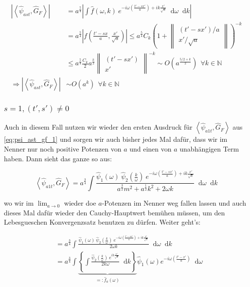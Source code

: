 \documentclass{scrartcl}
\renewcommand*\d{\mathop{}\!\mathrm{d}}
\begin{document}
\begin{align}
    \left| \left< \hat\psi_{ast}, \hat G_F \right> \right|
    &=
    a^\frac{5}{4} \left|  \int \hat f(\omega, k)
    ~e^{-i \omega \left(\frac{t'-sx'}{a}\right) + ik \frac{x'}{\sqrt{a}}}
    \d \omega \d k
    \right|
    \nonumber \\
    &=
    a^\frac{5}{4} \left| f \left(\frac{t'-sx}{a}, \frac{x'}{\sqrt{a}}\right) \right|
    \leq
    a^\frac{5}{4} C_k\left(
    1 + \left\lVert \substack{(t'-sx')/a \\ x'/\sqrt{a}} \right\rVert
    \right)^{-k}
    \nonumber \\
    &\leq
    a^\frac{5}{4} \frac{C_k}{2} a^{\frac{k}{2}} \left\lVert
    \substack{(t'-sx') \\ x'} \right\rVert^{-k}
    \sim O\left(a^\frac{5/2+k}{2}\right) ~~ \forall k \in \mathbb{N}
    \nonumber \\[1em]
    \Rightarrow
     \left| \left< \hat\psi_{ast}, \hat G_F \right> \right|
     &\sim
     O\left(a^k\right) ~~ \forall k \in \mathbb{N}
\end{align}


\subsubsection*{$s = 1, (t', s') \neq 0$}
Auch in diesem Fall nutzen wir wieder den ersten Ausdruck für
$\left< \hat\psi_{a1t}, \hat G_F \right>$ aus \eqref{eq:psi_ast_gf_1} und sorgen
wir auch bisher jedes Mal dafür, dass wir im Nenner nur noch positive Potenzen von
$a$ und einen von $a$ unabhängigen Term haben. Dann sieht das ganze so aus:

\begin{equation*}
    \left< \hat\psi_{a1t}, \hat G_F \right>
    =
    a^\frac{3}{4} \int \frac{\hat \psi_1(\omega)
    ~\hat\psi_2 \left(\frac{k}{\omega}\right)
    ~ e^{-i \omega \left(\frac{t'-sx'}{a}\right) + i k \frac{x'}{\sqrt{a}}}
    }
    {
        a^\frac{3}{2} m^2 + a^\frac{1}{2} k^2 + 2 \omega k
    }
    \d \omega \d k
\end{equation*}

wo wir im $\lim_{a \rightarrow 0}$ wieder doe $a$-Potenzen im Nenner weg fallen lassen
und auch dieses Mal dafür wieder den Cauchy-Hauptwert bemühen müssen, um den
Lebesgueschen Konvergenzsatz benutzen zu dürfen.
Weiter geht's:

\begin{align}
    &=
    a^\frac{3}{4} \int \frac{
    \hat \psi_1(\omega)
    ~\hat\psi_2 \left(\frac{k}{\omega}\right)
    ~ e^{-i \omega \left(\frac{t'-sx'}{a}\right) + i k \frac{x'}{\sqrt{a}}}
    }
    {
    2\omega k
    } \d \omega \d k \nonumber \\
    &= a^\frac{3}{4} \int
    \underbrace{\left\{ \int \frac{\hat \psi_2\left(\frac{k}{\omega}\right)
        ~e^{ik\frac{x'}{\sqrt{a}}}
        }
        {
            2 k \omega
        }
        \d k
        \right\}}_{=: \hat f_a (\omega)}
    \hat \psi_1(\omega) e^{-i \omega \left(\frac{t'-x'}{a}\right)}
    \d \omega
\end{align}
\end{document}
